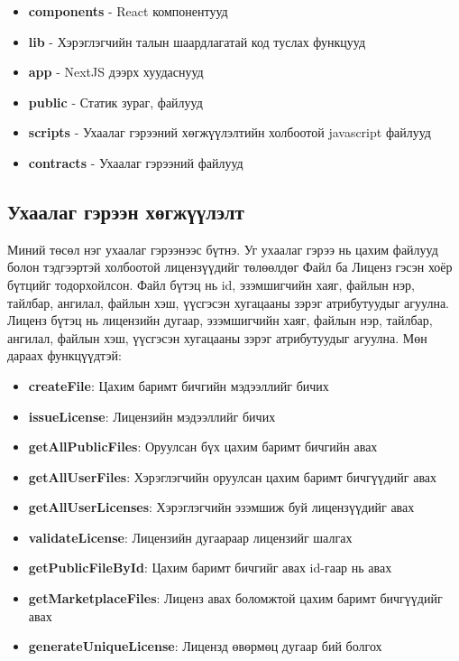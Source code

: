 \begin{itemize}
	\item \textbf{components} - React компонентууд
	\item \textbf{lib} - Хэрэглэгчийн талын шаардлагатай код туслах функцууд
	\item \textbf{app} - NextJS дээрх хуудаснууд
	\item \textbf{public} - Статик зураг, файлууд
	\item \textbf{scripts} - Ухаалаг гэрээний хөгжүүлэлтийн холбоотой  javascript файлууд
	\item \textbf{contracts} - Ухаалаг гэрээний файлууд
\end{itemize}

\subsection{Ухаалаг гэрээн хөгжүүлэлт}
Миний төсөл нэг ухаалаг гэрээнээс бүтнэ. Уг ухаалаг гэрээ нь цахим файлууд болон тэдгээртэй холбоотой лицензүүдийг төлөөлдөг Файл ба Лиценз гэсэн хоёр бүтцийг тодорхойлсон.
Файл бүтэц  нь id, эзэмшигчийн хаяг, файлын нэр, тайлбар, ангилал, файлын хэш, үүсгэсэн хугацааны  зэрэг атрибутуудыг агуулна.
Лиценз бүтэц нь лицензийн дугаар, эзэмшигчийн хаяг, файлын нэр, тайлбар, ангилал, файлын хэш, үүсгэсэн хугацааны  зэрэг атрибутуудыг агуулна.
Мөн дараах функцүүдтэй:

\begin{itemize}
	\item \textbf{createFile}: Цахим баримт бичгийн мэдээллийг бичих
	\item \textbf{issueLicense}: Лицензийн мэдээллийг бичих
	\item \textbf{getAllPublicFiles}: Оруулсан бүх цахим баримт бичгийн авах
	\item \textbf{getAllUserFiles}:  Хэрэглэгчийн оруулсан цахим баримт бичгүүдийг авах
	\item \textbf{getAllUserLicenses}: Хэрэглэгчийн эзэмшиж буй лицензүүдийг авах
	\item \textbf{validateLicense}: Лицензийн дугаараар лицензийг шалгах
	\item \textbf{getPublicFileById}: Цахим баримт бичгийг  авах id-гаар нь авах
	\item \textbf{getMarketplaceFiles}: Лиценз авах боломжтой цахим баримт бичгүүдийг авах
	\item \textbf{generateUniqueLicense}: Лицензд өвөрмөц дугаар бий болгох
\end{itemize}

